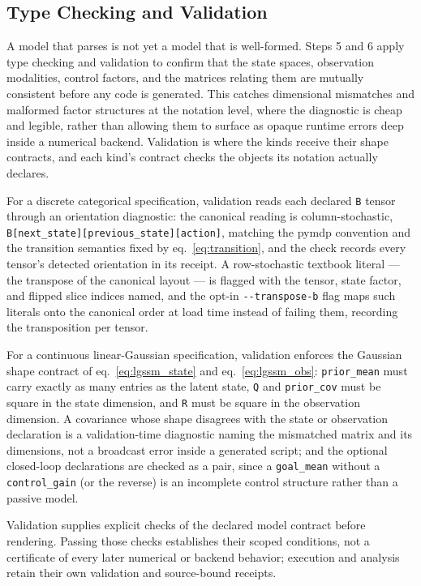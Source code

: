 \documentclass[
  english,
  9pt,
]{extarticle}
\begin{document}
\subsection{Type Checking and
Validation}\label{type-checking-and-validation}

A model that parses is not yet a model that is well-formed. Steps 5 and
6 apply type checking and validation to confirm that the state spaces,
observation modalities, control factors, and the matrices relating them
are mutually consistent before any code is generated. This catches
dimensional mismatches and malformed factor structures at the notation
level, where the diagnostic is cheap and legible, rather than allowing
them to surface as opaque runtime errors deep inside a numerical
backend. Validation is where the kinds receive their shape contracts,
and each kind's contract checks the objects its notation actually
declares.

For a discrete categorical specification, validation reads each declared
\texttt{B} tensor through an orientation diagnostic: the canonical
reading is column-stochastic,
\texttt{B{[}next\_state{]}{[}previous\_state{]}{[}action{]}}, matching
the pymdp convention \citep{heins2022} and the transition semantics
fixed by eq.~\ref{eq:transition}, and the check records every tensor's
detected orientation in its receipt. A row-stochastic textbook literal
--- the transpose of the canonical layout --- is flagged with the
tensor, state factor, and flipped slice indices named, and the opt-in
\texttt{-\/-transpose-b} flag maps such literals onto the canonical
order at load time instead of failing them, recording the transposition
per tensor.

For a continuous linear-Gaussian specification, validation enforces the
Gaussian shape contract of eq.~\ref{eq:lgssm_state} and
eq.~\ref{eq:lgssm_obs}: \texttt{prior\_mean} must carry exactly as many
entries as the latent state, \texttt{Q} and \texttt{prior\_cov} must be
square in the state dimension, and \texttt{R} must be square in the
observation dimension. A covariance whose shape disagrees with the state
or observation declaration is a validation-time diagnostic naming the
mismatched matrix and its dimensions, not a broadcast error inside a
generated script; and the optional closed-loop declarations are checked
as a pair, since a \texttt{goal\_mean} without a \texttt{control\_gain}
(or the reverse) is an incomplete control structure rather than a
passive model.

Validation supplies explicit checks of the declared model contract
before rendering. Passing those checks establishes their scoped
conditions, not a certificate of every later numerical or backend
behavior; execution and analysis retain their own validation and
source-bound receipts.
\end{document}
